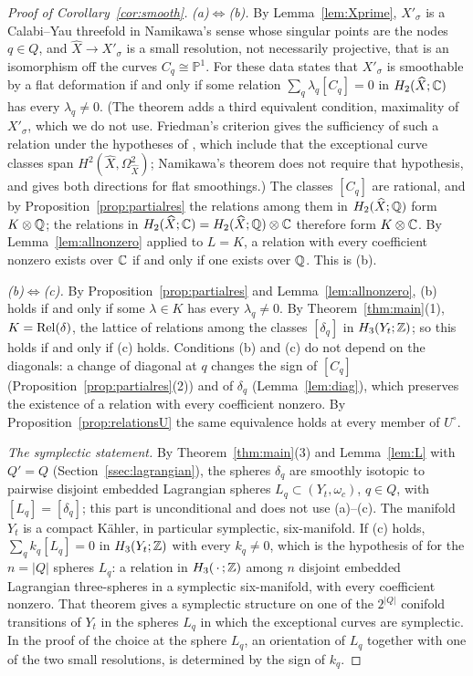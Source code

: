 \begin{proof}[Proof of Corollary~\ref{cor:smooth}]
\emph{(a)$\Leftrightarrow$(b).} By Lemma~\ref{lem:Xprime}, $X'_\sigma$ is a Calabi--Yau threefold in Namikawa's sense
whose singular points are the nodes $q\in Q$, and $\widehat X\to X'_\sigma$ is a small resolution, not necessarily projective,
that is an isomorphism off the curves $C_q\cong\mathbb P^1$. For these data \cite[Thm.~2.5]{Nam02} states that $X'_\sigma$ is
smoothable by a flat deformation if and only if some relation $\sum_q\lambda_q[C_q]=0$ in $H_2(\widehat X;\mathbb C)$ has every
$\lambda_q\neq0$. (The theorem adds a third equivalent condition, maximality of $X'_\sigma$, which we do not use.
Friedman's criterion \cite[Rem.~(4.5), Cor.~(4.7)]{Friedman} gives the sufficiency of such a relation under the
hypotheses of \cite[Thm.~(4.4)]{Friedman}, which include that the exceptional curve classes span
$H^2(\widehat X,\Omega^2_{\widehat X})$;
Namikawa's theorem does not require that hypothesis, and gives both directions for flat smoothings.) The classes $[C_q]$ are rational, and by
Proposition~\ref{prop:partialres} the relations among them in $H_2(\widehat X;\mathbb Q)$ form $K\otimes\mathbb Q$; the relations in
$H_2(\widehat X;\mathbb C)=H_2(\widehat X;\mathbb Q)\otimes\mathbb C$ therefore form $K\otimes\mathbb C$. By Lemma~\ref{lem:allnonzero} applied to $L=K$,
a relation with every coefficient nonzero exists over $\mathbb C$ if and only if one exists over $\mathbb Q$. This is (b).

\emph{(b)$\Leftrightarrow$(c).} By Proposition~\ref{prop:partialres} and Lemma~\ref{lem:allnonzero}, (b) holds if and only if
some $\lambda\in K$ has every $\lambda_q\neq0$. By Theorem~\ref{thm:main}(1), $K=\operatorname{Rel}(\delta)$, the lattice of relations
among the classes $[\delta_q]$ in $H_3(Y_t;\mathbb Z)$; so this holds if and only if (c) holds. Conditions (b) and (c) do not
depend on the diagonals: a change of diagonal at $q$ changes the sign of $[C_q]$ (Proposition~\ref{prop:partialres}(2)) and
of $\delta_q$ (Lemma~\ref{lem:diag}), which preserves the existence of a relation with every coefficient nonzero. By
Proposition~\ref{prop:relationsU} the same equivalence holds at every member of $U^\circ$.

\emph{The symplectic statement.} By Theorem~\ref{thm:main}(3) and Lemma~\ref{lem:L} with $Q'=Q$
(Section~\ref{ssec:lagrangian}), the spheres $\delta_q$ are smoothly isotopic to pairwise disjoint embedded Lagrangian
spheres $L_q\subset(Y_t,\omega_c)$, $q\in Q$, with $[L_q]=[\delta_q]$; this part is unconditional and does not use
(a)--(c). The manifold $Y_t$
is a compact K\"ahler, in particular symplectic, six-manifold. If (c) holds, $\sum_qk_q[L_q]=0$ in $H_3(Y_t;\mathbb Z)$ with every
$k_q\neq0$, which is the hypothesis of \cite[Thm.~2.9]{STY} for the $n=|Q|$ spheres $L_q$: a relation in $H_3(\,\cdot\,;\mathbb Z)$
among $n$ disjoint embedded Lagrangian three-spheres in a symplectic six-manifold, with every coefficient nonzero. That
theorem gives a symplectic structure on one of the $2^{|Q|}$ conifold transitions of $Y_t$ in the spheres $L_q$ in which
the exceptional curves are symplectic. In the proof of \cite[Thm.~2.9]{STY} the choice at the sphere $L_q$, an orientation
of $L_q$ together with one of the two small resolutions, is determined by the sign of $k_q$.
\end{proof}

